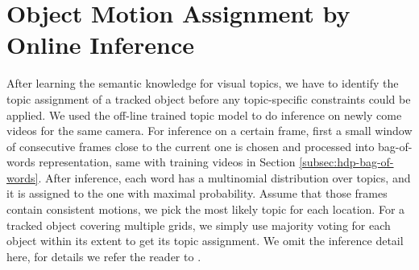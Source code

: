 \section{Object Motion Assignment by Online Inference}
\label{sec:semantic-inf}

After learning the semantic knowledge for visual topics, we have to identify the topic assignment of a tracked object before any topic-specific constraints could be applied.
We used the off-line trained topic model to do inference on newly come videos for the same camera. For inference on a certain frame, first a small window of consecutive frames close to the current one is chosen and processed into bag-of-words representation, same with training videos in Section \ref{subsec:hdp-bag-of-words}.  
After inference, each word has a multinomial distribution over topics, and it is assigned to the one with maximal probability. 
Assume that those frames contain consistent motions, we pick the most likely topic for each location. 
For a tracked object covering multiple grids, we simply use majority voting for each object within its extent to get its topic assignment.
We omit the inference detail here, for details we refer the reader to \cite{yee2006hierarchical}.
